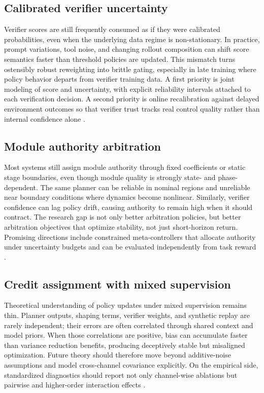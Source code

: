 \documentclass[pdflatex,sn-mathphys-num]{sn-jnl}
\begin{document}
\subsection{Calibrated verifier uncertainty}
Verifier scores are still frequently consumed as if they were calibrated probabilities, even when the underlying data regime is non-stationary. In practice, prompt variations, tool noise, and changing rollout composition can shift score semantics faster than threshold policies are updated. This mismatch turns ostensibly robust reweighting into brittle gating, especially in late training where policy behavior departs from verifier training data. A first priority is joint modeling of score and uncertainty, with explicit reliability intervals attached to each verification decision. A second priority is online recalibration against delayed environment outcomes so that verifier trust tracks real control quality rather than internal confidence alone \cite{arxiv_p_2602_06493,arxiv_p_2602_12579,arxiv_p_2602_02395}.

\subsection{Module authority arbitration}
Most systems still assign module authority through fixed coefficients or static stage boundaries, even though module quality is strongly state- and phase-dependent. The same planner can be reliable in nominal regions and unreliable near boundary conditions where dynamics become nonlinear. Similarly, verifier confidence can lag policy drift, causing authority to remain high when it should contract. The research gap is not only better arbitration policies, but better arbitration objectives that optimize stability, not just short-horizon return. Promising directions include constrained meta-controllers that allocate authority under uncertainty budgets and can be evaluated independently from task reward \cite{arxiv_p_2508_03680,arxiv_p_2601_16486,arxiv_p_2602_07906}.

\subsection{Credit assignment with mixed supervision}
Theoretical understanding of policy updates under mixed supervision remains thin. Planner outputs, shaping terms, verifier weights, and synthetic replay are rarely independent; their errors are often correlated through shared context and model priors. When those correlations are positive, bias can accumulate faster than variance reduction benefits, producing deceptively stable but misaligned optimization. Future theory should therefore move beyond additive-noise assumptions and model cross-channel covariance explicitly. On the empirical side, standardized diagnostics should report not only channel-wise ablations but pairwise and higher-order interaction effects \cite{arxiv_p_2510_20867,arxiv_p_2602_16165,arxiv_p_2601_06845}.
\end{document}
